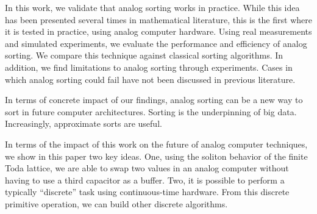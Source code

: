 In this work, we validate that analog sorting works in practice.
While this idea has been presented several times in mathematical literature, this is the first where it is tested in practice, using analog computer hardware.
Using real measurements and simulated experiments, we evaluate the performance and efficiency of analog sorting.
We compare this technique against classical sorting algorithms.
In addition, we find limitations to analog sorting through experiments. Cases in which analog sorting could fail have not been discussed in previous literature.

In terms of concrete impact of our findings, analog sorting can be a new way to sort in future computer architectures.
Sorting is the underpinning of big data.
Increasingly, approximate sorts are useful.

In terms of the impact of this work on the future of analog computer techniques, we show in this paper two key ideas.
One, using the soliton behavior of the finite Toda lattice, we are able to swap two values in an analog computer without having to use a third capacitor as a buffer.
Two, it is possible to perform a typically ``discrete'' task using continuous-time hardware.
From this discrete primitive operation, we can build other discrete algorithms.


